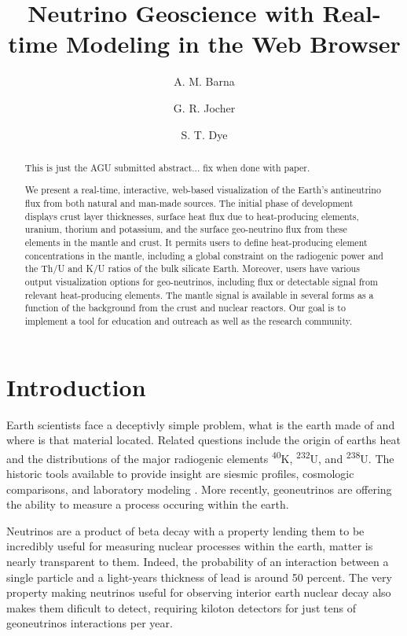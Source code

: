 \documentclass[12pt,a4paper]{article}
\title{Neutrino Geoscience with Real-time Modeling in the Web Browser}
\author[1]{A. M. Barna}
\author[2]{G. R. Jocher}
\author[3]{S. T. Dye}
\affil[1]{Scripps Institution of Oceanography 9500 Gilman Drive La Jolla, California 92093-0214}
\affil[2]{Ultralytics LLC, Arlington, VA 22201}
\affil[3]{Hawaii Pacific University 45-045 Kamehameha Hwy, Kaneohe, HI 96744}
\begin{document}
\maketitle
\begin{abstract}
  This is just the AGU submitted abstract... fix when done with paper.

  We present a real-time, interactive, web-based visualization of the Earth's antineutrino flux from both natural and man-made sources.
  The initial phase of development displays crust layer thicknesses, surface heat flux due to heat-producing elements, uranium, thorium and potassium, and the surface geo-neutrino flux from these elements in the mantle and crust.
  It permits users to define heat-producing element concentrations in the mantle, including a global constraint on the radiogenic power and the Th/U and K/U ratios of the bulk silicate Earth.
  Moreover, users have various output visualization options for geo-neutrinos, including flux or detectable signal from relevant heat-producing elements.
  The mantle signal is available in several forms as a function of the background from the crust and nuclear reactors.
  Our goal is to implement a tool for education and outreach as well as the research community.
\end{abstract}
\clearpage

\section{Introduction}
Earth scientists face a deceptivly simple problem, what is the earth made of and where is that material located.
Related questions include the origin of earths heat and the distributions of the major radiogenic elements \textsuperscript{40}K, \textsuperscript{232}U, and \textsuperscript{238}U.
The historic tools available to provide insight are siesmic profiles, cosmologic comparisons, and laboratory modeling \cite{McDonough1995}.
More recently, geoneutrinos are offering the ability to measure a process occuring within the earth\cite{McDonough2012}.

Neutrinos are a product of beta decay with a property lending them to be incredibly useful for measuring nuclear processes within the earth, matter is nearly transparent to them.
Indeed, the probability of an interaction between a single particle and a light-years thickness of lead is around 50 percent\cite{McDonough2014}.
The very property making neutrinos useful for observing interior earth nuclear decay also makes them dificult to detect, requiring kiloton detectors for just tens of geoneutrinos interactions per year.
\end{document}
